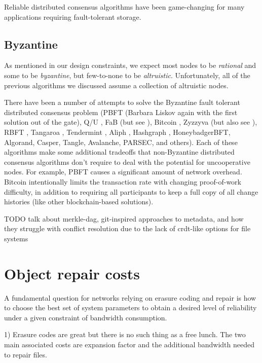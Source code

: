 \documentclass[11pt,fleqn,openany]{book}
\newcommand{\todo}[1]{{\color{red} TODO #1 }}
\begin{document}
Reliable distributed consensus algorithms have been game-changing for many
applications requiring fault-tolerant storage.

\section{Byzantine}

As mentioned in our design constraints, we expect most nodes to be {\em
rational} and some to be {\em byzantine}, but few-to-none to be {\em
altruistic}. Unfortunately, all of the previous algorithms we discussed assume a
collection of altruistic nodes.

There have been a number of attempts to solve the Byzantine fault tolerant
distributed consensus problem
(PBFT \cite{pbft} (Barbara Liskov again with the
first solution out of the gate), Q/U \cite{qu}, FaB \cite{fab} (but see
\cite{fab-revisited}), Bitcoin \cite{bitcoin}, Zyzzyva \cite{zyzzyva} (but also
see \cite{fab-revisited}), RBFT \cite{rbft}, Tangaroa \cite{tangaroa},
Tendermint \cite{tendermint}, Aliph \cite{aliph}, Hashgraph \cite{hashgraph},
HoneybadgerBFT\cite{honeybadger}, Algorand\cite{algorand}, Casper\cite{casper},
Tangle\cite{tangle}, Avalanche\cite{avalanche}, PARSEC\cite{parsec}, and
others\cite{mickens-bft}).
Each of these algorithms make some
additional tradeoffs that non-Byzantine distributed consensus algorithms don't
require to deal with the potential for uncooperative nodes. For example,
PBFT \cite{pbft} causes a significant amount of network overhead. Bitcoin
\cite{bitcoin} intentionally limits the transaction rate with changing
proof-of-work difficulty, in addition to requiring all participants to keep a
full copy of all change histories (like other blockchain-based
solutions).

\todo{talk about merkle-dag, git-inspired approaches to metadata, and how
they struggle with conflict resolution due to the lack of crdt-like options for
file systems}

\chapter{Object repair costs}

A fundamental question for networks relying on erasure coding and repair is
how to choose the best set of system parameters to obtain a desired level of
reliability under a given constraint of bandwidth consumption.

1) Erasure codes are great but there is no such thing as a free lunch. The two
main associated costs are expansion factor and the additional bandwidth needed
to repair files.
\end{document}
